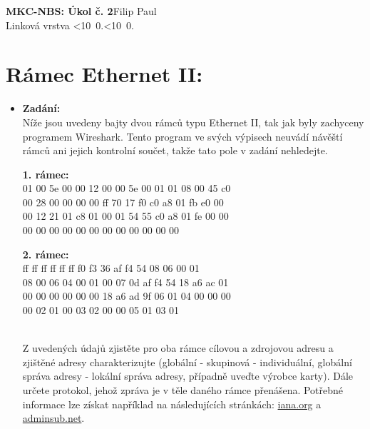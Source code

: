 \documentclass[10pt, a4paper]{article}%
\def\mydate{\leavevmode\hbox{\twodigits\day.\twodigits\month.\the\year}}
\def\twodigits#1{\ifnum#1<10 0\fi\the#1}
\begin{document}
\begin{flushleft}%
	\textbf{\Large{MKC-NBS: Úkol č. 2}}\hfill Filip Paul\\
	\large{Linková vrstva \hfill\mydate}
\end{flushleft}
\section*{\large{\textbf{Rámec Ethernet II:}}}
	\begin{itemize}[label={}]
		\item \textbf{Zadání:}\\
		Níže jsou uvedeny bajty dvou rámců typu Ethernet II, tak jak byly zachyceny programem 
		Wireshark. Tento program ve svých výpisech neuvádí návěští rámců ani jejich kontrolní součet, 
		takže tato pole v zadání nehledejte.\\

		\begin{minipage}{0.49\textwidth}
			\textbf{1. rámec:}\\
			01 00 5e 00 00 12 00 00 5e 00 01 01 08 00 45 c0\\
			00 28 00 00 00 00 ff 70 17 f0 c0 a8 01 fb e0 00\\
			00 12 21 01 c8 01 00 01 54 55 c0 a8 01 fe 00 00\\
			00 00 00 00 00 00 00 00 00 00 00 00
		\end{minipage}
		\begin{minipage}{0.49\textwidth}
			\textbf{2. rámec:}\\
			ff ff ff ff ff ff f0 f3 36 af f4 54 08 06 00 01\\ 
			08 00 06 04 00 01 00 07 0d af f4 54 18 a6 ac 01\\ 
			00 00 00 00 00 00 18 a6 ad 9f 06 01 04 00 00 00\\ 
			00 02 01 00 03 02 00 00 05 01 03 01
		\end{minipage}\\

		Z uvedených údajů zjistěte pro oba rámce cílovou a zdrojovou adresu a zjištěné adresy 
		charakterizujte (globální - skupinová - individuální, globální správa adresy - lokální správa adresy, 
		případně uveďte výrobce karty). Dále určete protokol, jehož zpráva je v těle daného rámce 
		přenášena. Potřebné informace lze získat například na následujících stránkách: 
		\href{https://www.iana.org/assignments/ethernet-numbers/ethernet-numbers.xhtml}{\color{blue} iana.org}
		a \href{https://www.adminsub.net/mac-address-finder}{\color{blue} adminsub.net}.


\end{itemize}
\end{document}
